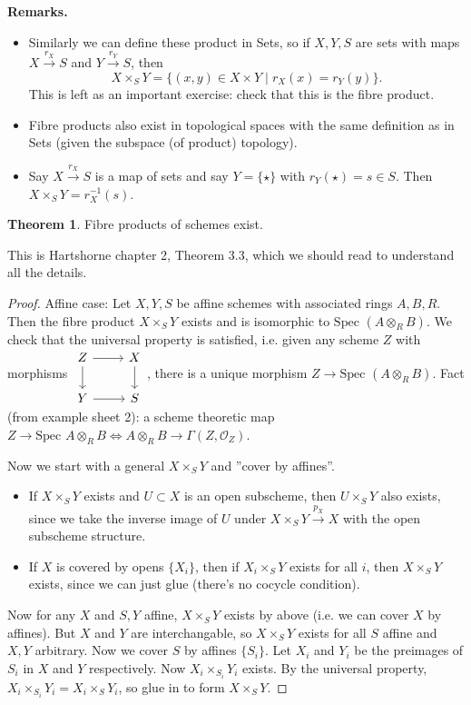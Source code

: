 \documentclass{article}
\theoremstyle{definition}
\newtheorem{theorem}{Theorem}[section]
\begin{document}
\textbf{Remarks.} 
\begin{itemize}
    \item Similarly we can define these product in Sets, so if $X,Y,S$ are sets with maps $X \stackrel{r_X}{\to} S$ and $Y \stackrel{r_Y}{\to} S$, then $$X \times_S Y = \{(x,y) \in X \times Y \mid r_X(x) = r_Y(y)\}.$$
    This is left as an important exercise: check that this is the fibre product.
    \item Fibre products also exist in topological spaces with the same definition as in Sets (given the subspace (of product) topology).
    \item Say $X \stackrel{r_X}{\to} S$ is a map of sets and say $Y = \{\star\}$ with $r_Y(\star) = s \in S$. Then $X \times_S Y = r_X^{-1}(s)$.
\end{itemize}
\begin{theorem}
    Fibre products of schemes exist.
\end{theorem}
This is Hartshorne chapter 2, Theorem 3.3, which we should read to understand all the details.
\begin{proof}
    Affine case: Let $X,Y,S$ be affine schemes with associated rings $A,B,R$. Then the fibre product $X \times_S Y$ exists and is isomorphic to $\text{Spec }(A \otimes_R B)$. We check that the universal property is satisfied, i.e. given any scheme $Z$ with morphisms $\begin{tikzcd}[]
        Z & X\\
        Y & S
        \arrow["", from=1-2, to=2-2]
        \arrow["",from=1-1, to=2-1]
        \arrow["", from=2-1, to=2-2]
        \arrow["", from=1-1, to=1-2]
    \end{tikzcd}$, there is a unique morphism $Z \to \text{Spec }(A \otimes_R B)$. Fact (from example sheet 2): a scheme theoretic map $Z \to \text{Spec }A \otimes_R B \iff A \otimes_R B \to \Gamma(Z,\mathcal{O}_Z)$.
    \vspace{1mm}
     
    Now we start with a general $X \times_S Y$ and ''cover by affines''. 
    \begin{itemize}
        \item If $X \times_S Y$ exists and $U \subset X$ is an open subscheme, then $U \times_S Y$ also exists, since we take the inverse image of $U$ under $X \times_S Y \stackrel{p_X}{\to} X$ with the open subscheme structure.
        \item If $X$ is covered by opens $\{X_i\}$, then if $X_i \times_S Y$ exists for all $i$, then $X \times_S Y$ exists, since we can just glue (there's no cocycle condition).
    \end{itemize}
    Now for any $X$ and $S,Y$ affine, $X \times_S Y$ exists by above (i.e. we can cover $X$ by affines). But $X$ and $Y$ are interchangable, so $X \times_S Y$ exists for all $S$ affine and $X,Y$ arbitrary. Now we cover $S$ by affines $\{S_i\}$. Let $X_i$ and $Y_i$ be the preimages of $S_i$ in $X$ and $Y$ respectively. Now $X_i \times_{S_i} Y_i$ exists. By the universal property, $X_i \times_{S_i} Y_i = X_i \times_S Y_i$, so glue in to form $X \times_S Y$.
\end{proof}
\end{document}
